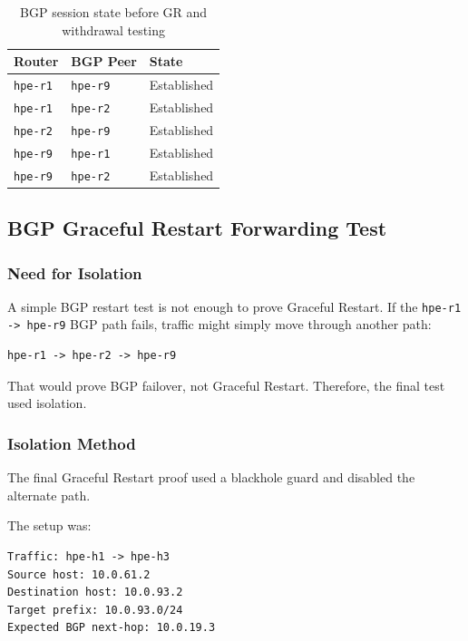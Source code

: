 \begin{table}[h]
\centering
\begin{tabular}{|l|l|l|}
\hline
\textbf{Router} & \textbf{BGP Peer} & \textbf{State} \\
\hline
\texttt{hpe-r1} & \texttt{hpe-r9} & Established \\
\hline
\texttt{hpe-r1} & \texttt{hpe-r2} & Established \\
\hline
\texttt{hpe-r2} & \texttt{hpe-r9} & Established \\
\hline
\texttt{hpe-r9} & \texttt{hpe-r1} & Established \\
\hline
\texttt{hpe-r9} & \texttt{hpe-r2} & Established \\
\hline
\end{tabular}
\caption{BGP session state before GR and withdrawal testing}
\end{table}

\subsection{BGP Graceful Restart Forwarding Test}

\subsubsection{Need for Isolation}

A simple BGP restart test is not enough to prove Graceful Restart. If the \texttt{hpe-r1 -> hpe-r9} BGP path fails, traffic might simply move through another path:

\begin{verbatim}
hpe-r1 -> hpe-r2 -> hpe-r9
\end{verbatim}

That would prove BGP failover, not Graceful Restart. Therefore, the final test used isolation.

\subsubsection{Isolation Method}

The final Graceful Restart proof used a blackhole guard and disabled the alternate path.

The setup was:

\begin{verbatim}
Traffic: hpe-h1 -> hpe-h3
Source host: 10.0.61.2
Destination host: 10.0.93.2
Target prefix: 10.0.93.0/24
Expected BGP next-hop: 10.0.19.3
\end{verbatim}

